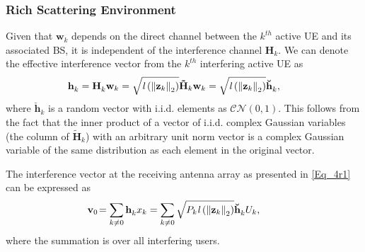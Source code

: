 \documentclass[12pt, draftclsnofoot, onecolumn]{IEEEtran}
\theoremstyle{plain}
\begin{document}
\subsubsection{Rich Scattering Environment}
Given that $\textbf{w}_{k}$ depends on the direct channel between the $k^{th}$ active UE and its associated BS, it is independent of the interference channel ${\mathbf{{H}}_{k}^{}}$. We can denote the effective interference vector from the $k^{th}$ interfering active {UE} as
\begin{align}\label{NewChannel}
%
%
{{\mathbf{{h}}}_{k}^{}}&={\mathbf{{H}}_{k}^{}} \textbf{w}_{k} = \sqrt{\mathit{l}\left({\Vert \bold{z}_k \Vert}_2\right)} \mathbf{\tilde{H}}_{k} \textbf{w}_{k} = \sqrt{\mathit{l}\left({\Vert \bold{z}_k \Vert}_2\right)} {{\mathbf{\breve{h}}}_{k}^{}},&&%
%
%
\end{align}
where ${{\mathbf{\breve{h}}}_{k}^{}}$ is a random vector with i.i.d. elements as $\mathcal{CN}(0,1)$. 
{This follows from the fact that the inner product of a vector of i.i.d. complex Gaussian variables  (the column of $\mathbf{\tilde{H}}_{k}$) with an arbitrary unit norm vector is a complex Gaussian variable of the same distribution as each element in the original vector.}
%

The interference vector {\color{black}at the receiving antenna array as} presented in \eqref{Eq_4r1} can be expressed as
\begin{align}
\!\!\!\!\!\!\textbf{v}_{0}&\!=\sum\limits_{k\neq 0} {{\mathbf{h}}_{k}^{}} x_{k} = \sum\limits_{k\neq 0} \sqrt{P_k \mathit{l}\left({\Vert \bold{z}_k \Vert}_2\right)} \mathbf{\breve{h}}_{k}^{} U_k,\label{eq11a_2}
\end{align}
where the summation is over all interfering users.  
%
\end{document}
